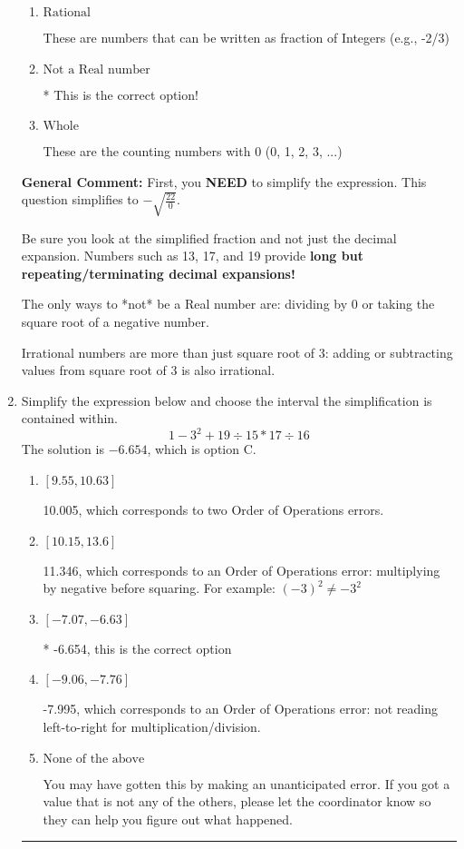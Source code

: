 \documentclass{extbook}[14pt]
\newcommand{\litem}[1]{\item #1

\rule{\textwidth}{0.4pt}}
\begin{document}
\begin{enumerate}
{\begin{enumerate}[label=\Alph*.]
These cannot be written as a fraction of Integers.
\item \( \text{Rational} \)

These are numbers that can be written as fraction of Integers (e.g., -2/3)
\item \( \text{Not a Real number} \)

* This is the correct option!
\item \( \text{Whole} \)

These are the counting numbers with 0 (0, 1, 2, 3, ...)
\end{enumerate}

\textbf{General Comment:} First, you \textbf{NEED} to simplify the expression. This question simplifies to $-\sqrt{\frac{22}{0}}$. 
 
 Be sure you look at the simplified fraction and not just the decimal expansion. Numbers such as 13, 17, and 19 provide \textbf{long but repeating/terminating decimal expansions!} 
 
 The only ways to *not* be a Real number are: dividing by 0 or taking the square root of a negative number. 
 
 Irrational numbers are more than just square root of 3: adding or subtracting values from square root of 3 is also irrational.
}
\litem{
Simplify the expression below and choose the interval the simplification is contained within.
\[ 1 - 3^2 + 19 \div 15 * 17 \div 16 \]The solution is \( -6.654 \), which is option C.\begin{enumerate}[label=\Alph*.]
\item \( [9.55, 10.63] \)

 10.005, which corresponds to two Order of Operations errors.
\item \( [10.15, 13.6] \)

 11.346, which corresponds to an Order of Operations error: multiplying by negative before squaring. For example: $(-3)^2 \neq -3^2$
\item \( [-7.07, -6.63] \)

* -6.654, this is the correct option
\item \( [-9.06, -7.76] \)

 -7.995, which corresponds to an Order of Operations error: not reading left-to-right for multiplication/division.
\item \( \text{None of the above} \)

 You may have gotten this by making an unanticipated error. If you got a value that is not any of the others, please let the coordinator know so they can help you figure out what happened.
\end{enumerate}

}
\end{enumerate}
\end{document}
